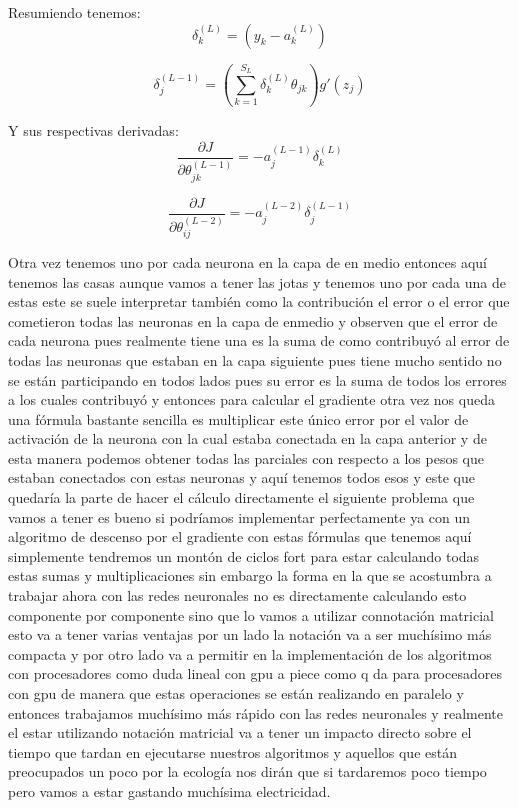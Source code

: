 Resumiendo tenemos:
\begin{equation}
 \delta_{k}^{(L)} = (y_{k}-a_{k}^{(L)})
\end{equation}

\begin{equation}
 \delta_{j}^{(L-1)} = \left( \sum_{k=1}^{S_{L}} \delta_{k}^{(L)} \theta_{jk}\right)g'(z_j)
\end{equation}

Y sus respectivas derivadas:
\begin{equation}
 \dfrac{\partial J}{\partial \theta_{jk}^{(L-1)}} = -a_{j}^{(L-1)}\delta_{k}^{(L)}
\end{equation}

\begin{equation}
 \dfrac{\partial J}{\partial \theta_{ij}^{(L-2)}} = -a_{j}^{(L-2)}\delta_{j}^{(L-1)}
\end{equation}

Otra vez tenemos uno por cada neurona en la capa de en medio entonces aquí tenemos las casas aunque vamos a tener las jotas y tenemos uno por cada una de estas este se suele interpretar también como la contribución el error o el error que cometieron todas las neuronas en la capa de enmedio y observen que el error de cada neurona pues realmente tiene una es la suma de como contribuyó al error de todas las neuronas que estaban en la capa siguiente pues tiene mucho sentido no se están participando en todos lados pues su error es la suma de todos los errores a los cuales contribuyó y entonces para calcular el gradiente otra vez nos queda una fórmula bastante sencilla es multiplicar este único error por el valor de activación de la neurona con la cual estaba conectada en la capa anterior y de esta manera podemos obtener todas las parciales con respecto a los pesos que estaban conectados con estas neuronas y aquí tenemos todos esos y este que quedaría la parte de hacer el cálculo directamente el siguiente problema que vamos a tener es bueno si podríamos implementar perfectamente ya con un algoritmo de descenso por el gradiente con estas fórmulas que tenemos aquí simplemente tendremos un montón de ciclos fort para estar calculando todas estas sumas y multiplicaciones sin embargo la forma en la que se acostumbra a trabajar ahora con las redes neuronales no es directamente calculando esto componente por componente sino que lo vamos a utilizar connotación matricial esto va a tener varias ventajas por un lado la notación va a ser muchísimo más compacta y por otro lado va a permitir en la implementación de los algoritmos con procesadores como duda lineal con gpu a piece como q da para procesadores con gpu de manera que estas operaciones se están realizando en paralelo y entonces trabajamos muchísimo más rápido con las redes neuronales y realmente el estar utilizando notación matricial va a tener un impacto directo sobre el tiempo que tardan en ejecutarse nuestros algoritmos y aquellos que están preocupados un poco por la ecología nos dirán que si tardaremos poco tiempo pero vamos a estar gastando muchísima electricidad.
